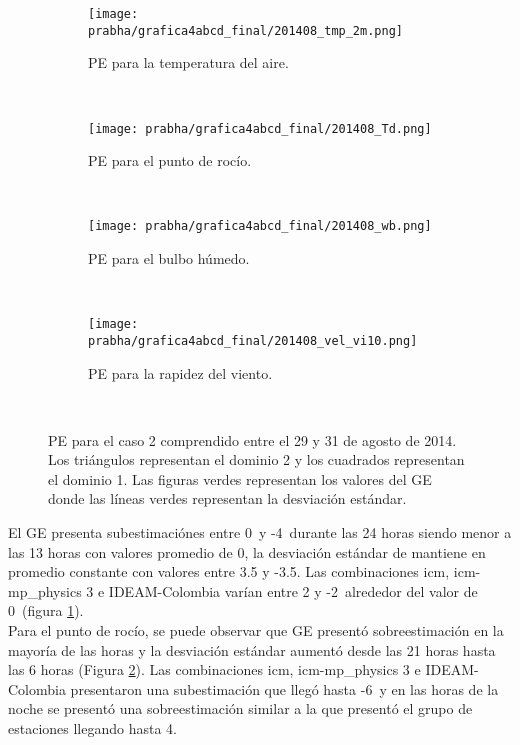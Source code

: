 \begin{figure}[H]
    \centering
    \begin{subfigure}[b]{0.45\textwidth}
        \caption{PE para la temperatura del aire.}
	\texttt{[image: prabha/grafica4abcd\_final/201408\_tmp\_2m.png]}
    \label{subfig:tmp_0_caso2}
	\end{subfigure}
	~
	    \begin{subfigure}[b]{0.45\textwidth}
	        \caption{PE para el punto de rocío.}
	\texttt{[image: prabha/grafica4abcd\_final/201408\_Td.png]}

    \label{subfig:td_caso2}
	\end{subfigure}
	~
	    \begin{subfigure}[b]{0.45\textwidth}
	\caption{PE para el bulbo húmedo.}
	\texttt{[image: prabha/grafica4abcd\_final/201408\_wb.png]}
    \label{subfig:wb_caso2}
	\end{subfigure}
	~
	    \begin{subfigure}[b]{0.45\textwidth}
	\caption{PE para la rapidez del viento.}	
	\texttt{[image: prabha/grafica4abcd\_final/201408\_vel\_vi10.png]}
    
    \label{subfig:vel_caso2}
	\end{subfigure}
	~

\caption{PE para el caso 2 comprendido entre el 29 y 31 de agosto de 2014. Los triángulos representan el dominio 2 y los cuadrados representan el dominio 1. Las figuras verdes representan los valores del GE donde las líneas verdes representan la desviación estándar.}	
\label{subfig:mbe_caso2}	
\end{figure}


El GE presenta subestimaciónes entre 0\celsius\ y -4\celsius\ durante las 24 horas siendo menor a las 13 horas con valores promedio de 0\celc, la desviación estándar de mantiene en promedio constante con valores entre 3.5 y -3.5\celc. Las combinaciones icm, icm-mp\_physics 3 e IDEAM-Colombia varían entre 2 y -2\celc\ alrededor del valor de 0\celc\ (figura \ref{subfig:tmp_0_caso2}).\\

Para el punto de rocío, se puede observar que GE presentó sobreestimación en la mayoría de las horas y la desviación estándar aumentó desde las 21 horas hasta las 6 horas (Figura \ref{subfig:td_caso2}). Las combinaciones icm, icm-mp\_physics 3 e IDEAM-Colombia presentaron una subestimación que llegó hasta -6\celc\ y en las horas de la noche se presentó una sobreestimación similar a la que presentó el grupo de estaciones llegando hasta 4\celc.\\


